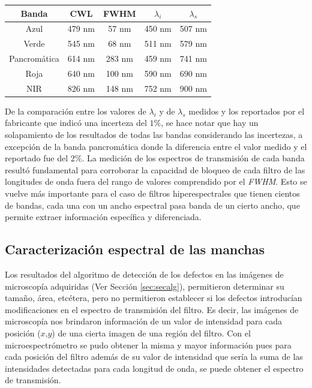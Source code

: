  \begin{table}[H]
\begin{center}
\begin{tabular}{ |c|c|c|c|c| }    \toprule
Banda & CWL & FWHM & $\lambda_{i}$ & $\lambda_{s}$\\\midrule
\rowcolor{blue!15} Azul    & 479 nm & 57 nm & 450 nm & 507 nm  \\ 
\rowcolor{green!50} Verde  & 545 nm & 68 nm & 511 nm & 579 nm\\ 
Pancromática& 614 nm & 283 nm & 459 nm & 741 nm\\
\rowcolor{red!50} Roja & 640 nm & 100 nm  & 590 nm  & 690 nm\\
\rowcolor{maroon!20} NIR & 826 nm & 148 nm  &  752 nm & 900 nm\\
\bottomrule
 \hline
\end{tabular}
\end{center}
 \label{tabespc}
 \end{table}
De la comparación entre los valores de $\lambda_{i}$ y de $\lambda_{s}$ medidos y los reportados por el fabricante que indicó una incerteza del $1\%$, se hace notar que hay un solapamiento de los resultados de todas las bandas considerando las incertezas, a excepción de la banda pancromática donde la diferencia entre el valor medido y el reportado fue del $2\%$.
La medición de los espectros de transmisión de cada banda resultó fundamental para corroborar la capacidad de bloqueo de cada filtro de las longitudes de onda fuera del rango de valores comprendido por el \textit{FWHM}. Esto se vuelve más importante para el caso de filtros hiperespectrales que tienen cientos de bandas, cada una con un ancho espectral pasa banda de un cierto ancho, que permite extraer información específica y diferenciada.



\singlespacing
\subsection{Caracterización espectral de las manchas}
\label{sec:defctma}

\hspace{0.5cm}Los resultados del algoritmo de detección de los defectos en las imágenes de microscopía adquiridas (Ver Sección \ref{sec:secalg}), permitieron determinar su tamaño, área, etcétera, pero no permitieron establecer si los defectos introducían modificaciones en el espectro de transmisión del filtro. Es decir, las imágenes de microscopía nos brindaron información de un valor de intensidad para cada posición ($\textit{x,y}$) de una cierta imagen de una región del filtro. Con el microespectrómetro se pudo obtener la misma y mayor información pues para cada posición del filtro además de su valor de intensidad que sería la suma de las intensidades detectadas para cada longitud de onda, se puede obtener el espectro de transmisión.

